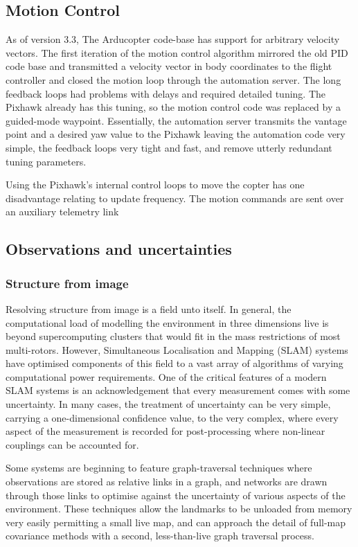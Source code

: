 \documentclass[a4paper, 11pt, titlepage]{article}
\begin{document}
  \subsection{Motion Control}
    As of version 3.3, The Arducopter code-base has support for arbitrary velocity vectors.  The first iteration of the motion control algorithm mirrored the old PID code base and transmitted a velocity vector in body coordinates to the flight controller and closed the motion loop through the automation server.  The long feedback loops had problems with delays and required detailed tuning.  The Pixhawk already has this tuning, so the motion control code was replaced by a guided-mode waypoint.  Essentially, the automation server transmits the vantage point and a desired yaw value to the Pixhawk leaving the automation code very simple, the feedback loops very tight and fast, and remove utterly redundant tuning parameters.

    Using the Pixhawk's internal control loops to move the copter has one disadvantage relating to update frequency.  The motion commands are sent over an auxiliary telemetry link

  \subsection{Observations and uncertainties}
    \subsubsection{Structure from image}
      Resolving structure from image is a field unto itself.  In general, the computational load of modelling the environment in three dimensions live is beyond supercomputing clusters that would fit in the mass restrictions of most multi-rotors.  However, Simultaneous Localisation and Mapping (SLAM) systems have optimised components of this field to a vast array of algorithms of varying computational power requirements.
      One of the critical features of a modern SLAM systems is an acknowledgement that every measurement comes with some uncertainty. 
      In many cases, the treatment of uncertainty can be very simple, carrying a one-dimensional confidence value, to the very complex, where every aspect of the measurement is recorded for post-processing where non-linear couplings can be accounted for.

      Some systems are beginning to feature graph-traversal techniques where observations are stored as relative links in a graph, and networks are drawn through those links to optimise against the uncertainty of various aspects of the environment.  These techniques allow the landmarks to be unloaded from memory very easily permitting a small live map, and can approach the detail of full-map covariance methods with a second, less-than-live graph traversal process.
\end{document}
